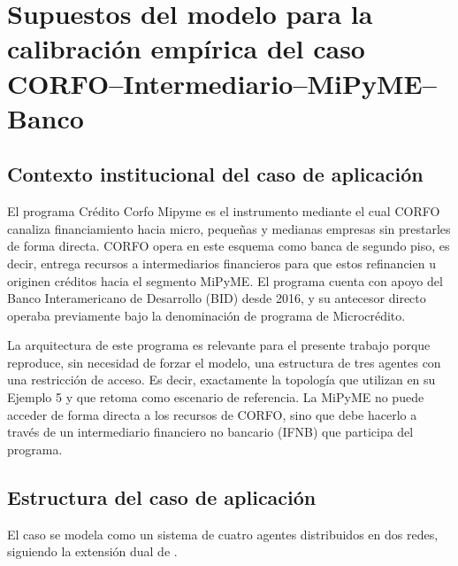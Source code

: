%

\chapter{Supuestos del modelo para la calibración empírica del caso CORFO--Intermediario--MiPyME--Banco}
\label{c_hito1}

\section{Contexto institucional del caso de aplicación}

El programa Crédito Corfo Mipyme es el instrumento mediante el cual CORFO canaliza financiamiento hacia micro, pequeñas y medianas empresas sin prestarles de forma directa. CORFO opera en este esquema como banca de segundo piso, es decir, entrega recursos a intermediarios financieros para que estos refinancien u originen créditos hacia el segmento MiPyME. El programa cuenta con apoyo del Banco Interamericano de Desarrollo (BID) desde 2016, y su antecesor directo operaba previamente bajo la denominación de programa de Microcrédito.

La arquitectura de este programa es relevante para el presente trabajo porque reproduce, sin necesidad de forzar el modelo, una estructura de tres agentes con una restricción de acceso. Es decir, exactamente la topología que  utilizan en su Ejemplo 5 y que  retoma como escenario de referencia. La MiPyME no puede acceder de forma directa a los recursos de CORFO, sino que debe hacerlo a través de un intermediario financiero no bancario (IFNB) que participa del programa.

\section{Estructura del caso de aplicación}
\label{sec:estructura}

El caso se modela como un sistema de cuatro agentes distribuidos en dos redes, siguiendo la extensión dual de .

